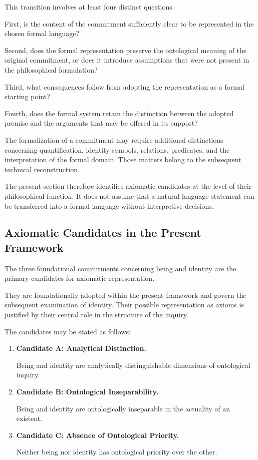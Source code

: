 This transition involves at least four distinct
questions.

First, is the content of the commitment sufficiently
clear to be represented in the chosen formal language?

Second, does the formal representation preserve
the ontological meaning of the original commitment,
or does it introduce assumptions that were not
present in the philosophical formulation?

Third, what consequences follow from adopting the
representation as a formal starting point?

Fourth, does the formal system retain the distinction
between the adopted premise and the arguments
that may be offered in its support?

The formalization of a commitment may require
additional distinctions concerning quantification,
identity symbols, relations, predicates, and the
interpretation of the formal domain. Those matters
belong to the subsequent technical reconstruction.

The present section therefore identifies axiomatic
candidates at the level of their philosophical
function. It does not assume that a natural-language
statement can be transferred into a formal language
without interpretive decisions.

\subsection{Axiomatic Candidates in the Present Framework}

The three foundational commitments concerning
being and identity are the primary candidates
for axiomatic representation.

They are foundationally adopted within the present
framework and govern the subsequent examination
of identity. Their possible representation as
axioms is justified by their central role in
the structure of the inquiry.

The candidates may be stated as follows:

\begin{enumerate}
    \item \textbf{Candidate A: Analytical Distinction.}

    Being and identity are analytically distinguishable
    dimensions of ontological inquiry.

    \item \textbf{Candidate B: Ontological Inseparability.}

    Being and identity are ontologically inseparable
    in the actuality of an existent.

    \item \textbf{Candidate C: Absence of Ontological Priority.}

    Neither being nor identity has ontological priority
    over the other.
\end{enumerate}


